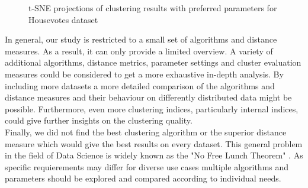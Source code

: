 
\begin{figure}[H]
	\centering
	\caption{t-SNE projections of clustering results with preferred parameters for Housevotes dataset}
	\label{fig:housevotes_bestparams}
\end{figure}

In general, our study is restricted to a small set of algorithms and distance measures. As a result, it can only provide a limited overview. A variety of additional algorithms, distance metrics, parameter settings and cluster evaluation measures could be considered to get a more exhaustive in-depth analysis. By including more datasets a more detailed comparison of the algorithms and distance measures and their behaviour on differently distributed data might be possible. Furthermore, even more clustering indices, particularly internal indices, could give further insights on the clustering quality. \\

Finally, we did not find the best clustering algorithm or the superior distance measure which would give the best results on every dataset. This general problem in the field of Data Science is widely known as the "No Free Lunch Theorem" \cite{nofreelunch}. As specific requierements may differ for diverse use cases multiple algorithms and parameters should be explored and compared according to individual needs. 
